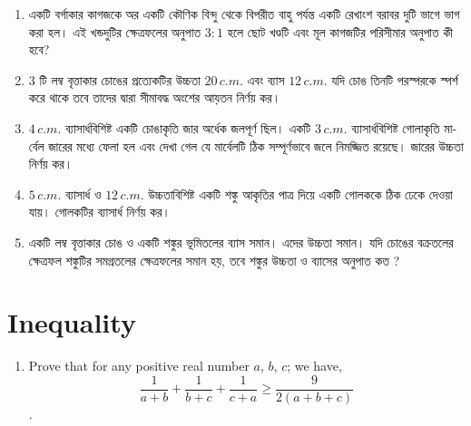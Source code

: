 \documentclass[11pt, a4paper]{article}
\begin{document}
\begin{enumerate}

	\item \textbengali{একটি বর্গাকার কাগজকে অর একটি কৌণিক বিন্দু থেকে বিপরীত বাহু পর্যন্ত একটি রেখাংশ বরাবর দুটি ভাগে ভাগ করা হল। এই খন্ডদুটির ক্ষেত্রফলের অনুপাত} $3:1$ \textbengali{হলে ছোট খণ্ডটি এবং মূল কাগজটির পরিসীমার অনুপাত কী হবে?}
	
	\item $3$ \textbengali{টি লম্ব বৃত্তাকার চোঙের প্রত্যেকটির উচ্চতা} $20\,c.m.$ \textbengali{এবং ব্যাস} $12\,c.m.$ \textbengali{যদি চোঙ তিনটি পরস্পরকে স্পর্শ করে থাকে তবে তাদের দ্বারা সীমাবদ্ধ অংশের আয়তন নির্ণয় কর।}

	\item $4\,c.m.$ \textbengali{ব্যাসার্ধবিশিষ্ট একটি চোঙাকৃতি জার অর্ধেক জলপূর্ণ ছিল। একটি} $3\,c.m.$ \textbengali{ব্যাসার্ধবিশিষ্ট গোলাকৃতি মার্বেল জারের মধ্যে ফেলা হল এবং দেখা গেল যে মার্বেলটি ঠিক সম্পূর্ণভাবে জলে নিমজ্জিত রয়েছে। জারের উচ্চতা নির্ণয় কর।}
	
	\item $5\,c.m.$ \textbengali{ব্যাসার্ধ ও} $12\,c.m.$ \textbengali{উচ্চতাবিশিষ্ট একটি শঙ্কু আকৃতির পাত্র দিয়ে একটি গোলককে ঠিক ঢেকে দেওয়া যায়। গোলকটির ব্যাসার্ধ নির্ণয় কর।}
	
	\item \textbengali{একটি লম্ব বৃত্তাকার চোঙ ও একটি শঙ্কুর ভূমিতলের ব্যাস সমান। এদের উচ্চতা সমান। যদি চোঙের বক্রতলের ক্ষেত্রফল শঙ্কুটির সমগ্রতলের ক্ষেত্রফলের সমান হয়, তবে শঙ্কুর উচ্চতা ও ব্যাসের অনুপাত কত ?}

\end{enumerate}


\section{Inequality}

\begin{enumerate}

\item Prove that for any positive real number $a$, $b$, $c$; we have,
$$\dfrac{1}{a+b} + \dfrac{1}{b+c} + \dfrac{1}{c+a} \geq \dfrac{9}{2(a+b+c)}$$.
\end{enumerate}
\end{document}
